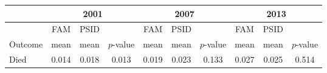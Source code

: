 \begin{tabular}{p{1.2in}*{3}{c}*{3}{c}*{3}{c}}
\toprule
 \multicolumn{1}{c}{} & \multicolumn{3}{c}{2001} & \multicolumn{3}{c}{2007} & \multicolumn{3}{c}{2013} \\
\midrule
 \multicolumn{1}{c}{} & FAM & PSID & & FAM & PSID & & FAM & PSID & \\
 \multicolumn{1}{l}{Outcome} & mean & mean & $p$-value & mean & mean & $p$-value & mean & mean & $p$-value \\
\midrule
Died&0.014&0.018&0.013&0.019&0.023&0.133&0.027&0.025&0.514\\
\bottomrule
\end{tabular}
